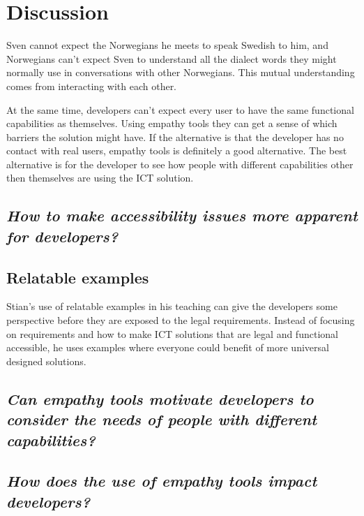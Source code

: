 \chapter{Discussion}
Sven cannot expect the Norwegians he meets to speak Swedish to him, and Norwegians can't expect Sven to understand all the dialect words they might normally use in conversations with other Norwegians. This mutual understanding comes from interacting with each other.

At the same time, developers can't expect every user to have the same functional capabilities as themselves. Using empathy tools they can get a sense of which barriers the solution might have. If the alternative is that the developer has no contact with real users, empathy tools is definitely a good alternative. The best alternative is for the developer to see how people with different capabilities other then themselves are using the ICT solution.

\section{\textit{How to make accessibility issues more apparent for developers?}}
\section{Relatable examples}
Stian's use of relatable examples in his teaching can give the developers some perspective before they are exposed to the legal requirements. Instead of focusing on requirements and how to make ICT solutions that are legal and functional accessible, he uses examples where everyone could benefit of more universal designed solutions.




\section{\textit{Can empathy tools motivate developers to consider the needs of people with different capabilities?}}




\section{\textit{How does the use of empathy tools impact developers?}}


